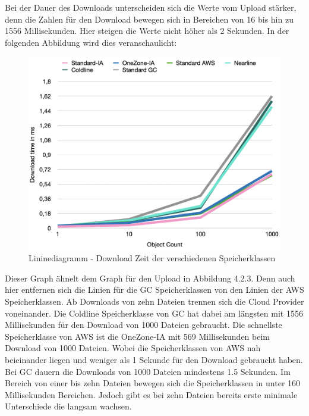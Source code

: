 \newpage

Bei der Dauer des Downloads unterscheiden sich die Werte vom Upload stärker, denn die Zahlen für den Download bewegen sich in Bereichen von 16 bis hin zu 1556 Millisekunden. Hier steigen die Werte nicht höher als 2 Sekunden. In der folgenden Abbildung wird dies veranschaulicht:

\begin{figure}[h]
	\centering
	\includegraphics[width=13cm,keepaspectratio]{Pictures/DownloadTime.png}
	\caption{Lininediagramm - Download Zeit der verschiedenen Speicherklassen}
\end{figure}

Dieser Graph ähnelt dem Graph für den Upload in Abbildung 4.2.3. Denn auch hier entfernen sich die Linien für die GC Speicherklassen von den Linien der AWS Speicherklassen. Ab Downloads von zehn Dateien trennen sich die Cloud Provider voneinander. Die Coldline Speicherklasse von GC hat dabei am längsten mit 1556 Millisekunden für den Download von 1000 Dateien gebraucht. Die schnellste Speicherklasse von AWS ist die OneZone-IA mit 569 Millisekunden beim Download von 1000 Dateien. Wobei die Speicherklassen von AWS nah beieinander liegen und weniger als 1 Sekunde für den Download gebraucht haben. Bei GC dauern die Downloads von 1000 Dateien mindestens 1.5 Sekunden. Im Bereich von einer bis zehn Dateien bewegen sich die Speicherklassen in unter 160 Millisekunden Bereichen. Jedoch gibt es bei zehn Dateien bereits erste minimale Unterschiede die langsam wachsen.\\
 
